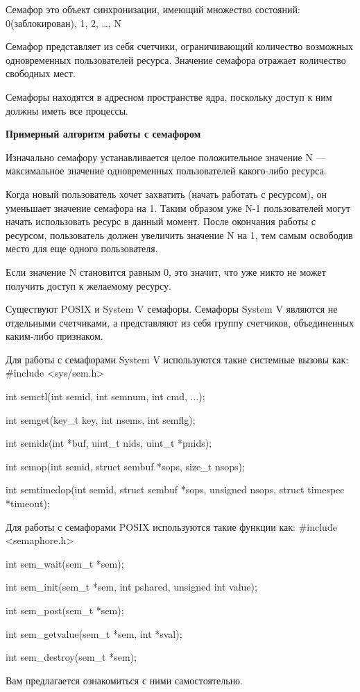 \begin{defi}{Семафор}
	это объект синхронизации, имеющий множество состояний: 0(заблокирован), 1, 2, …, N
\end{defi}

Семафор представляет из себя счетчики, ограничивающий количество возможных одновременных пользователей ресурса. Значение семафора отражает количество свободных мест.

Семафоры находятся в адресном пространстве ядра, поскольку доступ к ним должны иметь все процессы.

\textbf{Примерный алгоритм работы с семафором}

Изначально семафору устанавливается целое положительное значение N --- максимальное значение одновременных пользователей какого-либо ресурса. 

Когда новый пользователь хочет захватить (начать работать с ресурсом), он уменьшает значение семафора на 1. Таким образом уже N-1 пользователей могут начать использовать ресурс в данный момент. После окончания работы с ресурсом, пользователь должен увеличить значение N на 1, тем самым освободив место для еще одного пользователя. 

Если значение N становится равным 0, это значит, что уже никто не может получить доступ к желаемому ресурсу.

Существуют POSIX и System V семафоры. Семафоры System V являются не отдельными счетчиками, а представляют из себя группу счетчиков, объединенных каким-либо признаком.

\begin{CCode}{Для работы с семафорами System V используются такие системные вызовы как:}
	#include <sys/sem.h>

	int semctl(int semid, int semnum, int cmd, ...);

	int semget(key_t key, int nsems, int semflg);

	int semids(int *buf, uint_t nids, uint_t *pnids);

	int semop(int semid, struct sembuf *sops, size_t nsops);

	int semtimedop(int semid, struct sembuf *sops, unsigned nsops,
			struct timespec *timeout); \end{CCode}

\begin{CCode}{Для работы с семафорами POSIX используются такие функции как:}
	#include <semaphore.h>

	int sem_wait(sem_t *sem);

	int sem_init(sem_t *sem, int pshared, unsigned int value);

	int sem_post(sem_t *sem);

	int sem_getvalue(sem_t *sem, int *sval);

	int sem_destroy(sem_t *sem); \end{CCode}

Вам предлагается ознакомиться с ними самостоятельно.
